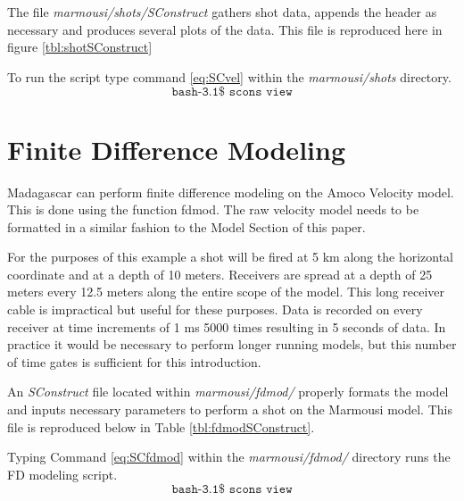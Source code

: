 The file \emph{marmousi/shots/SConstruct} gathers shot data, appends the header as necessary and produces several plots of the data.  This file is reproduced here in figure \ref{tbl:shotSConstruct}


{
\tiny

\normalsize
}


To run the script type command \ref{eq:SCvel} within the \emph{marmousi\slash shots} directory.
\begin{equation}\label{eq:SCvel} \texttt{bash-3.1\$\ scons\ view} \end{equation}


\section{Finite Difference Modeling}
Madagascar can perform finite difference modeling on the Amoco Velocity model.  This is done using the function fdmod.
The raw velocity model needs to be formatted in a similar fashion to the Model Section of this paper.

For the purposes of this example a shot will be fired at 5 km along the horizontal coordinate and at a depth of 10 meters.  Receivers are
spread at a depth of 25 meters every 12.5 meters along the entire scope of the model.  This long receiver cable is impractical but useful for these
purposes.  Data is recorded on every receiver at time increments of 1 ms 5000 times resulting in 5 seconds of data.  In practice it would be 
necessary to perform longer running models, but this number of time gates is sufficient for this introduction. 

An \emph{SConstruct} file located within \emph{marmousi/fdmod/} properly formats the model and inputs necessary parameters to perform a shot 
on the Marmousi model.  This file is reproduced below in Table \ref{tbl:fdmodSConstruct}.

{
\tiny

\normalsize
}

Typing Command \ref{eq:SCfdmod} within the \emph{marmousi/fdmod/} directory runs the FD modeling script.
\begin{equation}\label{eq:SCfdmod} \texttt{bash-3.1\$\ scons\ view} \end{equation}

